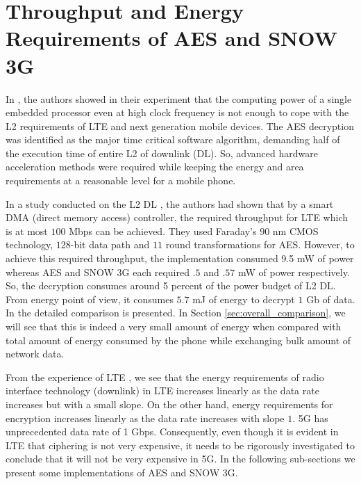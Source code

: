 \documentclass[12pt]{llncs}
\begin{document}
\section{Throughput and Energy Requirements of AES and SNOW 3G}
\label{sec:throughput_and_energy_requirements_of_aes_snow3g}
In \cite{IIS_Ruhr_2009}, the authors showed in their experiment that the computing power of a single embedded processor even at high clock frequency is not enough to cope with the L2 requirements of LTE and next generation mobile devices. The AES decryption was identified as the major time critical software algorithm, demanding half of the execution time of entire L2 of downlink (DL). So, advanced hardware acceleration methods were required while keeping the energy and area requirements at a reasonable level for a mobile phone.

In a study conducted on the L2 DL \cite{IIS_Ruhr_2010}, the authors had shown that by a smart DMA (direct memory access) controller, the required throughput for LTE which is at most $100$ Mbps can be achieved. They used Faraday's $90$ nm CMOS technology, $128$-bit data path and $11$ round transformations for AES. However, to achieve this required throughput, the implementation consumed 9.5 mW of power whereas AES and SNOW 3G each required $.5$ and $.57$ mW of power respectively. So, the decryption consumes around 5 percent of the power budget of L2 DL. From energy point of view, it consumes $5.7$ mJ of energy to decrypt $1$ Gb of data. In \cite[Figure 6]{IIS_Ruhr_2010} the detailed comparison is presented. In Section \ref{sec:overall_comparison}, we will see that this is indeed a very small amount of energy when compared with total amount of energy consumed by the phone while exchanging bulk amount of network data.

From the experience of LTE \cite[Fig 9]{Mobisys_2012}, we see that the energy requirements of radio interface technology (downlink) in LTE increases linearly as the data rate increases but with a small slope. On the other hand, energy requirements for encryption increases linearly as the data rate increases with slope $1$. 5G has unprecedented data rate of 1 Gbps. Consequently, even though it is evident in LTE that ciphering is not very expensive, it needs to be rigorously investigated to conclude that it will not be very expensive in 5G. In the following sub-sections we present some implementations of AES and SNOW 3G.
\end{document}
